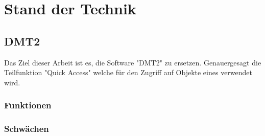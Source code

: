 \chapter{Stand der Technik}

\section{DMT2}
Das Ziel dieser Arbeit ist es, die Software "DMT2" zu ersetzen. Genauergesagt die Teilfunktion "Quick Access" welche für den Zugriff auf Objekte eines verwendet wird.

\subsection{Funktionen}

\subsection{Schwächen}